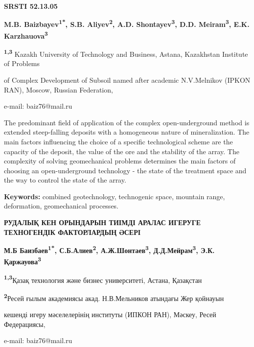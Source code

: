 \clearpage
{\bfseries SRSTI 52.13.05}


\begin{center}
{\bfseries M.B. Baizbayev\textsuperscript{1*}, S.B.
Aliyev\textsuperscript{2}, A.D. Shontayev\textsuperscript{3}, D.D.
Meiram\textsuperscript{3}, E.K. Karzhauova\textsuperscript{3}}

{\bfseries \textsuperscript{1,3}} Kazakh University of Technology and
Business, Astana, Kazakhstan Institute of Problems

of Complex Development of Subsoil named after academic N.V.Melnikov
(IPKON RAN), Moscow, Russian Federation,

e-mail: baiz76@mail.ru
\end{center}

\hspace{1.5em} The predominant field of application of the complex open-underground
method is extended steep-falling deposits with a homogeneous nature of
mineralization. The main factors influencing the choice of a specific
technological scheme are the capacity of the deposit, the value of the
ore and the stability of the array. The complexity of solving
geomechanical problems determines the main factors of choosing an
open-underground technology - the state of the treatment space and the
way to control the state of the array.

\hspace{1.5em} {\bfseries Keywords:} combined geotechnology, technogenic space, mountain
range, deformation, geomechanical processes.

\begin{center}
{\large\bfseries РУДАЛЫҚ КЕН ОРЫНДАРЫН ТИІМДІ АРАЛАС ИГЕРУГЕ ТЕХНОГЕНДІК ФАКТОРЛАРДЫҢ ӘСЕРІ}

{\bfseries М.Б Баизбаев\textsuperscript{1*}, С.Б.Алиев\textsuperscript{2},
А.Ж.Шонтаев\textsuperscript{3}, Д.Д.Мейрам\textsuperscript{3}, Э.К.
Қаржауова\textsuperscript{3}}

{\bfseries \textsuperscript{1,3}}Қазақ технология және бизнес университеті,
Астана, Қазақстан

{\bfseries \textsuperscript{2}}Ресей ғылым академиясы акад. Н.В.Мельников
атындағы Жер қойнауын

кешенді игеру мәселелерінің институты (ИПКОН РАН), Мәскеу, Ресей
Федерациясы,

e-mail: baiz76@mail.ru
\end{center}

